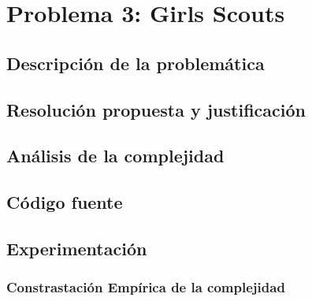 \section{Problema 3: Girls Scouts}
\subsection{Descripci\'on de la problem\'atica}



\subsection{Resoluci\'on propuesta y justificaci\'on}

\subsection{An\'alisis de la complejidad}

\subsection{C\'odigo fuente}
\subsection{Experimentaci\'on}

\subsubsection{Constrastaci\'on Emp\'irica de la complejidad}\label{tiempos}
